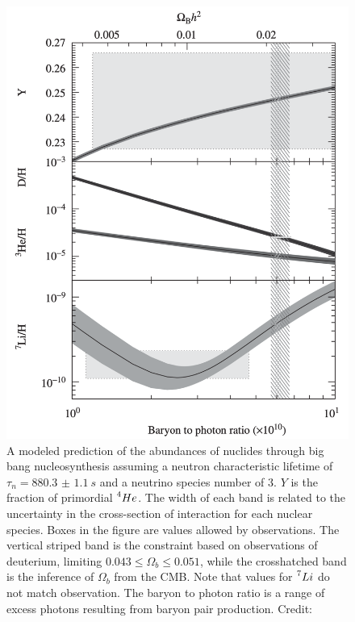 \documentclass{paper}
\begin{document}
  \begin{figure}[H]
    \begin{centering}
    \includegraphics[scale=0.4]{BBN-ratios.pdf}
    \caption{A modeled prediction of the abundances of nuclides through big
      bang nucleosynthesis assuming a neutron characteristic lifetime of
      \(\tau_n = \SI{880.3(11)}{s}\) and a neutrino species number of 3. 
      \(Y\) is the fraction of primordial \(\prescript{4}{}{He}\). The width 
      of each band is related to the uncertainty in the cross-section of 
      interaction for each nuclear species. Boxes in the figure are values 
      allowed by observations. The vertical striped band is the constraint 
      based on observations of deuterium, limiting 
      \(0.043 \leq \Omega_b \leq 0.051\), while the crosshatched band 
      is the inference of \(\Omega_b\) from the CMB. Note that values for 
      \(\prescript{7}{}{Li}\) do not match observation. The baryon to photon 
      ratio is a range of excess photons resulting from baryon pair 
      production.
      Credit: \cite{liddle2015introduction}}
    \label{fig:BBN-ratios}
    \end{centering}
  \end{figure}
\end{document}
